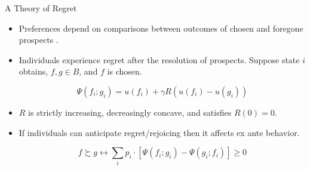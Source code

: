 \documentclass[aspectratio=169]{beamer}
\begin{document}
\begin{frame}{A Theory of Regret}

	\begin{itemize}

		\item Preferences depend on comparisons between outcomes of chosen and foregone prospects \parencite{bell_risk_1983,loomes_regret_1982}.

		\item Individuals experience regret after the resolution of prospects. Suppose state $i$ obtains, $f, g \in B$, and $f$ is chosen.

			\[ \Psi(f_i; g_i) = u(f_i) + \gamma R(u(f_i) - u(g_i)) \]

		\item $R$ is strictly increasing, decreasingly concave, and satisfies $R(0) = 0$.

		\item If individuals can anticipate regret/rejoicing then it affects ex ante behavior.

		\[ f \succsim g \leftrightarrow \sum_i p_{i} \cdot [\Psi(f_i; g_i) - \Psi(g_i; f_i)] \geq 0 \]




	\end{itemize}
	
\end{frame}
\end{document}
